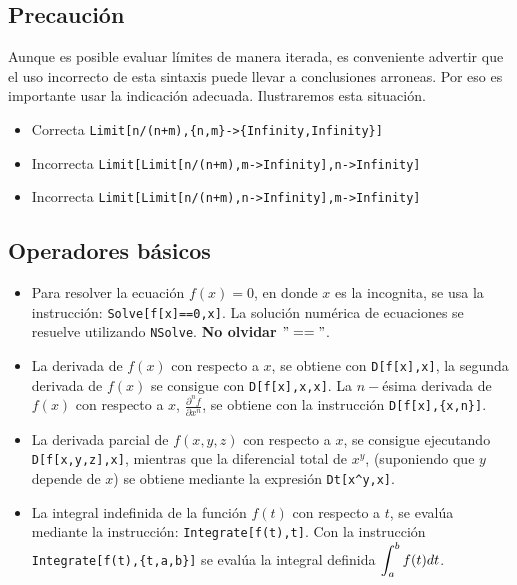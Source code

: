    \subsection{Precaución}
    Aunque es posible evaluar límites de manera iterada, es conveniente advertir que el uso
    incorrecto de esta sintaxis puede llevar a conclusiones arroneas.
    Por eso es importante usar la indicación adecuada. Ilustraremos esta situación.
    \begin{itemize}
      \item Correcta {\small \verb"Limit[n/(n+m),{n,m}->{Infinity,Infinity}]"}
      \item Incorrecta {\small \verb"Limit[Limit[n/(n+m),m->Infinity],n->Infinity]"}
      \item Incorrecta {\small \verb"Limit[Limit[n/(n+m),n->Infinity],m->Infinity]"}
    \end{itemize}

    \subsection{Operadores básicos}
     
    \begin{itemize}
      \item Para resolver la ecuación $f(x)=0$, en donde $x$ es la incognita, se usa la
        instrucción: \verb"Solve[f[x]==0,x]". La solución numérica de ecuaciones se resuelve utilizando \verb"NSolve".
        {\bf No olvidar $"=="$}.
      \item La derivada de $f(x)$ con respecto a $x$, se obtiene con \verb"D[f[x],x]",
        la segunda derivada de $f(x)$ se consigue con \verb"D[f[x],x,x]".
        La $n-$ésima derivada de $f(x)$ con respecto a $x$, $\frac{\partial^n f}{\partial x^n}$, se obtiene con la instrucción
        \verb"D[f[x],{x,n}]".
      \item La derivada parcial de $f(x,y,z)$ con respecto a $x$, se consigue ejecutando \verb"D[f[x,y,z],x]", mientras que
        la diferencial total de $x^y$, (suponiendo que $y$ depende de $x$) se obtiene mediante la expresión
        \verb"Dt[x^y,x]". 
      \item La integral indefinida de la función $f(t)$ con respecto a $t$,
        se evalúa mediante la instrucción: \hskip0.1cm \verb"Integrate[f(t),t]".
        Con la instrucción \\\verb"Integrate[f(t),{t,a,b}]" se evalúa la integral definida $\displaystyle \int_a^bf(t)dt$.
    \end{itemize}

